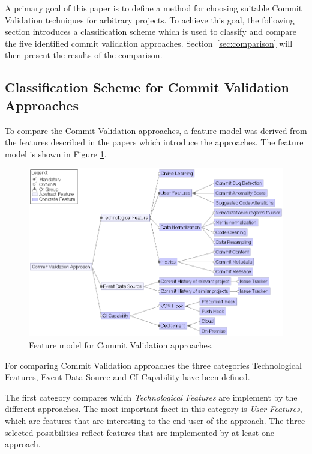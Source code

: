A primary goal of this paper is to define a method for choosing suitable Commit Validation techniques for arbitrary projects. To achieve this goal, the following section introduces a classification scheme which is used to classify and compare the five identified commit validation approaches. Section~\ref{sec:comparison} will then present the results of the comparison.

\subsection{Classification Scheme for Commit Validation Approaches}
\label{sec:scheme}

To compare the Commit Validation approaches, a feature model was derived from the features described in the papers which introduce the approaches. The feature model is shown in Figure \ref{fig:featuremodel}.

\begin{figure}[t]
	\centering
	\includegraphics[width=15cm]{images/featuremodel}
	\caption{Feature model for Commit Validation approaches.}
	\label{fig:featuremodel}
\end{figure}

For comparing Commit Validation approaches the three categories Technological Features, Event Data Source and CI Capability have been defined.

The first category compares which \textit{Technological Features} are implement by the different approaches. The most important facet in this category is \textit{User Features}, which are features that are interesting to the end user of the approach. The three selected possibilities reflect features that are implemented by at least one approach.

